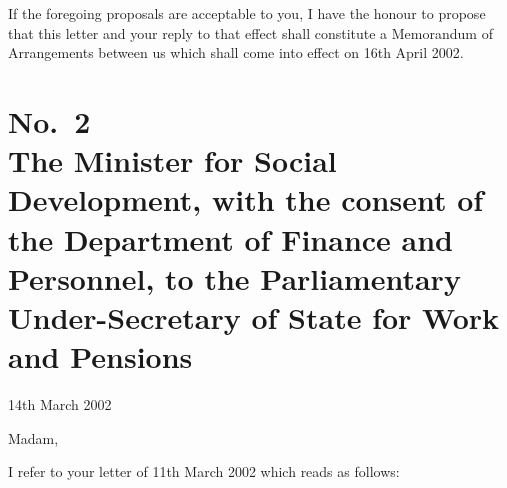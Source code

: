 \documentclass[12pt,a4paper]{article}
\begin{document}
If the foregoing proposals are acceptable to you, I have the honour to propose that this letter and your reply to that effect shall constitute a Memorandum of Arrangements between us which shall come into effect on 16th April 2002.

\section*{No.\ 2\\The Minister for Social Development, with the consent of the Department of Finance and Personnel, to the Parliamentary Under-Secretary of State for Work and Pensions}

14th March 2002

Madam,

I refer to your letter of 11th March 2002 which reads as follows:
\end{document}
